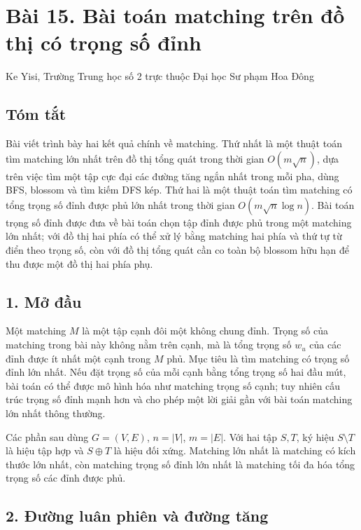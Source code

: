 \documentclass[11pt]{article}
\begin{document}
\section*{Bài 15. Bài toán matching trên đồ thị có trọng số đỉnh}

\begin{center}
Ke Yisi, Trường Trung học số 2 trực thuộc Đại học Sư phạm Hoa Đông
\end{center}

\subsection*{Tóm tắt}

Bài viết trình bày hai kết quả chính về matching. Thứ nhất là một thuật toán
tìm matching lớn nhất trên đồ thị tổng quát trong thời gian \(O(m\sqrt n)\),
dựa trên việc tìm một tập cực đại các đường tăng ngắn nhất trong mỗi pha, dùng
BFS, blossom và tìm kiếm DFS kép. Thứ hai là một thuật toán tìm matching có
tổng trọng số đỉnh được phủ lớn nhất trong thời gian
\(O(m\sqrt n\log n)\). Bài toán trọng số đỉnh được đưa về bài toán chọn tập
đỉnh được phủ trong một matching lớn nhất; với đồ thị hai phía có thể xử lý
bằng matching hai phía và thứ tự từ điển theo trọng số, còn với đồ thị tổng
quát cần co toàn bộ blossom hữu hạn để thu được một đồ thị hai phía phụ.

\subsection*{1. Mở đầu}

Một matching \(M\) là một tập cạnh đôi một không chung đỉnh. Trọng số của
matching trong bài này không nằm trên cạnh, mà là tổng trọng số \(w_u\) của
các đỉnh được ít nhất một cạnh trong \(M\) phủ. Mục tiêu là tìm matching có
trọng số đỉnh lớn nhất. Nếu đặt trọng số của mỗi cạnh bằng tổng trọng số hai
đầu mút, bài toán có thể được mô hình hóa như matching trọng số cạnh; tuy
nhiên cấu trúc trọng số đỉnh mạnh hơn và cho phép một lời giải gần với bài
toán matching lớn nhất thông thường.

Các phần sau dùng \(G=(V,E)\), \(n=|V|\), \(m=|E|\). Với hai tập \(S,T\), ký
hiệu \(S\setminus T\) là hiệu tập hợp và \(S\oplus T\) là hiệu đối xứng.
Matching lớn nhất là matching có kích thước lớn nhất, còn matching trọng số
đỉnh lớn nhất là matching tối đa hóa tổng trọng số các đỉnh được phủ.

\subsection*{2. Đường luân phiên và đường tăng}
\end{document}
